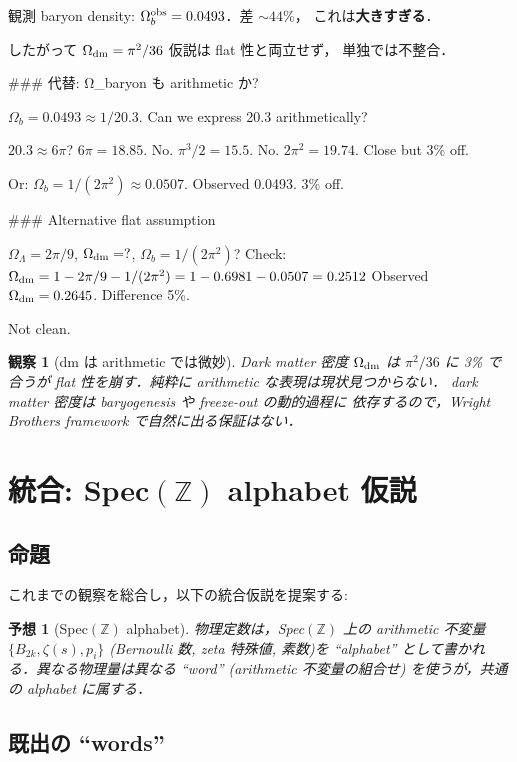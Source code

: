\documentclass[11pt,a4paper]{article}
\newtheorem{observation}{観察}
\newtheorem{conjecture}{予想}
\begin{document}
観測 baryon density: $\Omega_b^{\rm obs} = 0.0493$．差 $\sim 44\%$，
これは\textbf{大きすぎる}．

したがって $\Omega_{\rm dm} = \pi^2/36$ 仮説は flat 性と両立せず，
単独では不整合．

### 代替: Ω_baryon も arithmetic か?

$\Omega_b = 0.0493 \approx 1/20.3$. Can we express 20.3 arithmetically?

$20.3 \approx 6 \pi$? $6\pi = 18.85$. No.
$\pi^3/2 = 15.5$. No.
$2\pi^2 = 19.74$. Close but 3\% off.

Or: $\Omega_b = 1/(2\pi^2) \approx 0.0507$. Observed 0.0493. 3\% off.

### Alternative flat assumption

$\Omega_\Lambda = 2\pi/9$, $\Omega_{\rm dm} = ?$, $\Omega_b = 1/(2\pi^2)$?
Check: $\Omega_{\rm dm} = 1 - 2\pi/9 - 1/(2\pi^2) = 1 - 0.6981 - 0.0507 = 0.2512$
Observed $\Omega_{\rm dm} = 0.2645$. Difference 5\%.

Not clean.

\begin{observation}[dm は arithmetic では微妙]
Dark matter 密度 $\Omega_{\rm dm}$ は $\pi^2/36$ に 3\% で合うが
flat 性を崩す．純粋に arithmetic な表現は現状見つからない．
dark matter 密度は baryogenesis や freeze-out の動的過程に
依存するので，Wright Brothers framework で自然に出る保証はない．
\end{observation}

\section{統合: Spec$(\mathbb{Z})$ alphabet 仮説}

\subsection{命題}

これまでの観察を総合し，以下の統合仮説を提案する:

\begin{conjecture}[Spec$(\mathbb{Z})$ alphabet]
物理定数は，Spec$(\mathbb{Z})$ 上の arithmetic 不変量
$\{B_{2k}, \zeta(s), p_i\}$ (Bernoulli 数, zeta 特殊値, 素数)を
``alphabet'' として書かれる．異なる物理量は異なる ``word''
(arithmetic 不変量の組合せ) を使うが，共通の alphabet に属する．
\end{conjecture}

\subsection{既出の ``words''}
\end{document}
